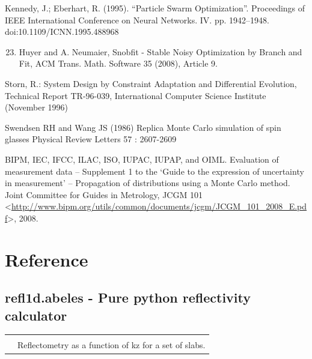 \documentclass[letterpaper,10pt,english]{sphinxmanual}
\begin{document}
Kennedy, J.; Eberhart, R. (1995). ``Particle Swarm Optimization''. Proceedings of IEEE International Conference on Neural Networks. IV. pp. 1942–1948. doi:10.1109/ICNN.1995.488968
\begin{enumerate}
\setcounter{enumi}{22}
\item {} 
Huyer and A. Neumaier, Snobfit - Stable Noisy Optimization by Branch and Fit, ACM Trans. Math. Software 35 (2008), Article 9.

\end{enumerate}

Storn, R.: System Design by Constraint Adaptation and Differential Evolution,
Technical Report TR-96-039, International Computer Science Institute (November 1996)

Swendsen RH and Wang JS (1986) Replica Monte Carlo simulation of spin glasses Physical Review Letters 57 : 2607-2609

BIPM, IEC, IFCC, ILAC, ISO, IUPAC, IUPAP, and OIML. Evaluation of measurement data – Supplement 1 to the ‘Guide to the expression of uncertainty in measurement’ – Propagation of distributions using a Monte Carlo method. Joint Committee for Guides in Metrology, JCGM 101 \textless{}\href{http://www.bipm.org/utils/common/documents/jcgm/JCGM\_101\_2008\_E.pdf}{http://www.bipm.org/utils/common/documents/jcgm/JCGM\_101\_2008\_E.pdf}\textgreater{}, 2008.


\chapter{Reference}
\label{api/index::doc}\label{api/index:reference}\label{api/index:api-index}

\section{refl1d.abeles - Pure python reflectivity calculator}
\label{api/abeles::doc}\label{api/abeles:refl1d-abeles-pure-python-reflectivity-calculator}
\begin{tabulary}{\linewidth}{LL}
\hline

{\hyperref[api/abeles:refl1d.abeles.calc]{}}
 & 

\\

{\hyperref[api/abeles:refl1d.abeles.refl]{}}
 & 
Reflectometry as a function of kz for a set of slabs.
\\
\hline
\end{tabulary}
\end{document}
